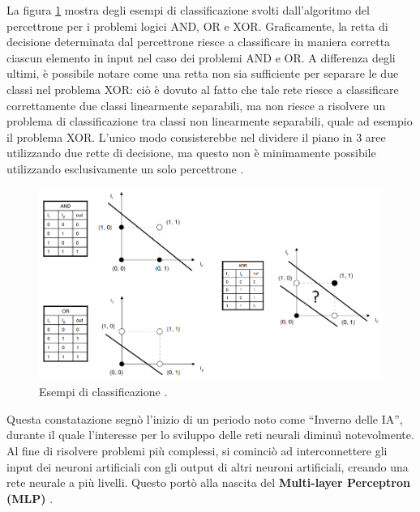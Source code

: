 La figura \ref{fig:XOR_GRAPH} mostra degli esempi di classificazione svolti dall'algoritmo del
percettrone per i problemi logici AND, OR e XOR. Graficamente, la retta di decisione
determinata dal percettrone riesce a classificare in maniera corretta ciascun elemento
in input nel caso dei problemi AND e OR. A differenza degli ultimi, è possibile notare
come una retta non sia sufficiente per separare le due classi nel problema XOR: ciò
è dovuto al fatto che tale rete riesce a classificare correttamente due classi 
linearmente separabili, ma non riesce a risolvere un problema di classificazione tra classi non
linearmente separabili, quale ad esempio il problema XOR.
L'unico modo consisterebbe nel dividere il piano in 3 aree utilizzando due rette di decisione, 
ma questo non è minimamente possibile utilizzando esclusivamente un solo percettrone 
\cite{LIMITI_PERCETTRONE, MODELLO_E_FUNZIONAMNETO_REURONE_BIOLOGICO}.

\begin{figure}[H]
    \centering
    \includegraphics[width=1\textwidth]{Immagini/Grafici/graficiLimitiPercettrone.png}
    \caption{Esempi di classificazione \cite{LIMITI_PERCETTRONE}.}
    \label{fig:XOR_GRAPH}
\end{figure}




Questa constatazione segnò l'inizio di un periodo noto come “Inverno delle IA”, durante 
il quale l'interesse per lo sviluppo delle reti neurali diminuì notevolmente.
Al fine di risolvere problemi più complessi, si cominciò ad interconnettere gli 
input dei neuroni artificiali con gli output di altri neuroni artificiali, creando 
una rete neurale a più livelli. Questo portò alla nascita 
del \textbf{Multi-layer Perceptron (MLP)} .


